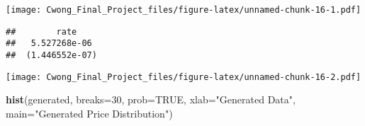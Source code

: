 \documentclass[]{article}
\newenvironment{Shaded}{\begin{snugshade}}{\end{snugshade}}
\newcommand{\KeywordTok}[1]{\textcolor[rgb]{0.13,0.29,0.53}{\textbf{#1}}}
\newcommand{\DataTypeTok}[1]{\textcolor[rgb]{0.13,0.29,0.53}{#1}}
\newcommand{\DecValTok}[1]{\textcolor[rgb]{0.00,0.00,0.81}{#1}}
\newcommand{\StringTok}[1]{\textcolor[rgb]{0.31,0.60,0.02}{#1}}
\newcommand{\OtherTok}[1]{\textcolor[rgb]{0.56,0.35,0.01}{#1}}
\newcommand{\OperatorTok}[1]{\textcolor[rgb]{0.81,0.36,0.00}{\textbf{#1}}}
\newcommand{\NormalTok}[1]{#1}
\begin{document}
\begin{Shaded}
\end{Shaded}

\texttt{[image: Cwong\_Final\_Project\_files/figure-latex/unnamed-chunk-16-1.pdf]}

\begin{Shaded}
\end{Shaded}

\begin{verbatim}
##        rate    
##   5.527268e-06 
##  (1.446552e-07)
\end{verbatim}

\begin{Shaded}
\end{Shaded}

\texttt{[image: Cwong\_Final\_Project\_files/figure-latex/unnamed-chunk-16-2.pdf]}

\begin{Shaded}
\begin{Highlighting}[]
\KeywordTok{hist}\NormalTok{(generated, }\DataTypeTok{breaks=}\DecValTok{30}\NormalTok{, }\DataTypeTok{prob=}\OtherTok{TRUE}\NormalTok{, }\DataTypeTok{xlab=}\StringTok{"Generated Data"}\NormalTok{, }\DataTypeTok{main=}\StringTok{"Generated Price Distribution"}\NormalTok{)}
\end{Highlighting}
\end{Shaded}
\end{document}
